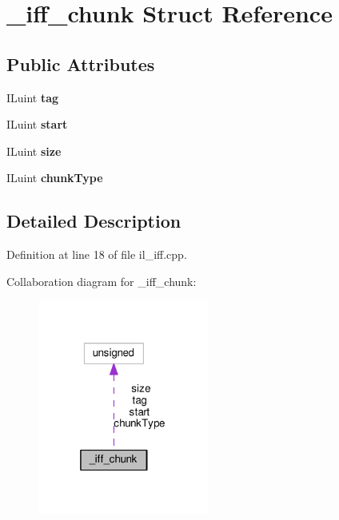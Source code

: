 \hypertarget{struct__iff__chunk}{}\section{\+\_\+iff\+\_\+chunk Struct Reference}
\label{struct__iff__chunk}
\subsection*{Public Attributes}
\begin{DoxyCompactItemize}
\item 
\mbox{\label{struct__iff__chunk_a20ee7b278c096a6a009a0672389453f5}} 
I\+Luint {\bfseries tag}
\item 
\mbox{\label{struct__iff__chunk_a9434f17b08e0e48beb9c112355792092}} 
I\+Luint {\bfseries start}
\item 
\mbox{\label{struct__iff__chunk_a93027fd59ce556b705c687583a34ec43}} 
I\+Luint {\bfseries size}
\item 
\mbox{\label{struct__iff__chunk_a9470ee6205a89a9cf329a4f63f44456e}} 
I\+Luint {\bfseries chunk\+Type}
\end{DoxyCompactItemize}


\subsection{Detailed Description}


Definition at line 18 of file il\+\_\+iff.\+cpp.



Collaboration diagram for \+\_\+iff\+\_\+chunk\+:
\nopagebreak
\begin{figure}[H]
\begin{center}
\leavevmode
\includegraphics[width=160pt]{d1/d0f/struct__iff__chunk__coll__graph}
\end{center}
\end{figure}


